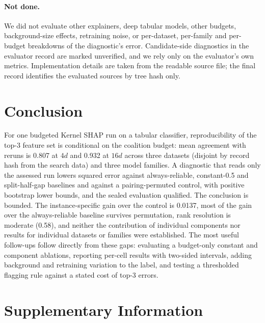 \documentclass{article}
\begin{document}
\paragraph{Not done.}
We did not evaluate other explainers, deep tabular models, other budgets, background-size effects, retraining noise, or per-dataset, per-family and per-budget breakdowns of the diagnostic's error. Candidate-side diagnostics in the evaluator record are marked unverified, and we rely only on the evaluator's own metrics. Implementation details are taken from the readable source file; the final record identifies the evaluated sources by tree hash only.

\section{Conclusion}
For one budgeted Kernel SHAP run on a tabular classifier, reproducibility of the top-3 feature set is conditional on the coalition budget: mean agreement with reruns is 0.807 at $4d$ and 0.932 at $16d$ across three datasets (disjoint by record hash from the search data) and three model families. A diagnostic that reads only the assessed run lowers squared error against always-reliable, constant-0.5 and split-half-gap baselines and against a pairing-permuted control, with positive bootstrap lower bounds, and the sealed evaluation qualified. The conclusion is bounded. The instance-specific gain over the control is 0.0137, most of the gain over the always-reliable baseline survives permutation, rank resolution is moderate (0.58), and neither the contribution of individual components nor results for individual datasets or families were established. The most useful follow-ups follow directly from these gaps: evaluating a budget-only constant and component ablations, reporting per-cell results with two-sided intervals, adding background and retraining variation to the label, and testing a thresholded flagging rule against a stated cost of top-3 errors.

\clearpage



\clearpage
\appendix
\section{Supplementary Information}
\end{document}
